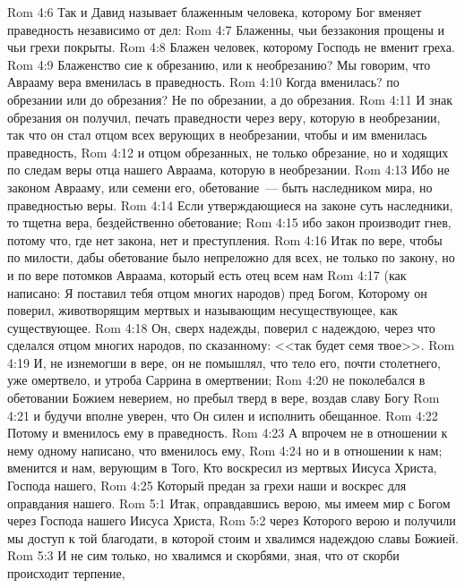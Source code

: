 \vs Rom 4:6 Так и Давид называет блаженным человека, которому Бог вменяет праведность независимо от дел:
\vs Rom 4:7 Блаженны, чьи беззакония прощены и чьи грехи покрыты.
\vs Rom 4:8 Блажен человек, которому Господь не вменит греха.
\vs Rom 4:9 Блаженство сие  к обрезанию, или к необрезанию? Мы говорим, что Аврааму вера вменилась в праведность.
\vs Rom 4:10 Когда вменилась? по обрезании или до обрезания? Не по обрезании, а до обрезания.
\vs Rom 4:11 И знак обрезания он получил,  печать праведности через веру, которую  в необрезании, так что он стал отцом всех верующих в необрезании, чтобы и им вменилась праведность,
\vs Rom 4:12 и отцом обрезанных, не только  обрезание, но и ходящих по следам веры отца нашего Авраама, которую  в необрезании.
\vs Rom 4:13 Ибо не законом  Аврааму, или семени его, обетование~--- быть наследником мира, но праведностью веры.
\vs Rom 4:14 Если утверждающиеся на законе суть наследники, то тщетна вера, бездейственно обетование;
\vs Rom 4:15 ибо закон производит гнев, потому что, где нет закона, нет и преступления.
\vs Rom 4:16 Итак по вере, чтобы  по милости, дабы обетование было непреложно для всех, не только по закону, но и по вере потомков Авраама, который есть отец всем нам
\vs Rom 4:17 (как написано: Я поставил тебя отцом многих народов) пред Богом, Которому он поверил, животворящим мертвых и называющим несуществующее, как существующее.
\vs Rom 4:18 Он, сверх надежды, поверил с надеждою, через что сделался отцом многих народов, по сказанному: <<так  будет семя твое>>.
\vs Rom 4:19 И, не изнемогши в вере, он не помышлял, что тело его, почти столетнего, уже омертвело, и утроба Саррина в омертвении;
\vs Rom 4:20 не поколебался в обетовании Божием неверием, но пребыл тверд в вере, воздав славу Богу
\vs Rom 4:21 и будучи вполне уверен, что Он силен и исполнить обещанное.
\vs Rom 4:22 Потому и вменилось ему в праведность.
\vs Rom 4:23 А впрочем не в отношении к нему одному написано, что вменилось ему,
\vs Rom 4:24 но и в отношении к нам; вменится и нам, верующим в Того, Кто воскресил из мертвых Иисуса Христа, Господа нашего,
\vs Rom 4:25 Который предан за грехи наши и воскрес для оправдания нашего.
\vs Rom 5:1 Итак, оправдавшись верою, мы имеем мир с Богом через Господа нашего Иисуса Христа,
\vs Rom 5:2 через Которого верою и получили мы доступ к той благодати, в которой стоим и хвалимся надеждою славы Божией.
\vs Rom 5:3 И не сим только, но хвалимся и скорбями, зная, что от скорби происходит терпение,

